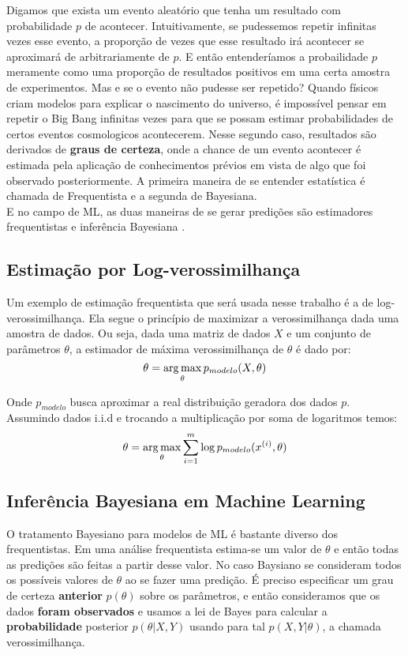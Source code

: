 Digamos que exista um evento aleatório que tenha um resultado com probabilidade $p$ de acontecer. Intuitivamente, se pudessemos repetir infinitas vezes esse evento, a proporção de vezes que esse resultado irá acontecer se aproximará de arbitrariamente de $p$. E então entenderíamos a probailidade $p$ meramente como uma proporção de resultados positivos em uma certa amostra de experimentos. Mas e se o evento não pudesse ser repetido? Quando físicos criam modelos para explicar o nascimento do universo, é impossível pensar em repetir o Big Bang infinitas vezes para que se possam estimar probabilidades de certos eventos cosmologicos acontecerem. Nesse segundo caso, resultados são derivados de \textbf{graus de certeza}, onde a chance de um evento acontecer é estimada pela aplicação de conhecimentos prévios em vista de algo que foi observado posteriormente. A primeira maneira de se entender estatística é chamada de Frequentista e a segunda de Bayesiana. \\

E no campo de ML, as duas maneiras de se gerar predições são estimadores frequentistas e inferência Bayesiana \citep{dlbook}.

\subsection{Estimação por Log-verossimilhança}

Um exemplo de estimação frequentista que será usada nesse trabalho é a de log-verossimilhança. 
Ela segue o princípio de maximizar a verossimilhança dada uma amostra de dados. Ou seja, dada uma matriz de dados $X$ e um conjunto de parâmetros $\theta$, a estimador de máxima verossimilhança de $\theta$ é dado por: \\

\[ \theta = \operatorname*{arg\,max}_{\theta} p_{modelo}(X,\theta) \] 

Onde $p_{modelo}$ busca aproximar a real distribuição geradora dos dados $p$. Assumindo dados i.i.d e trocando a multiplicação por soma de logaritmos temos: \\

\[ \theta = \operatorname*{arg\,max}_{\theta} \sum_{i=1}^{m} \log p_{modelo}(x^{(i)},\theta) \]


\subsection{Inferência Bayesiana em Machine Learning}

O tratamento Bayesiano para modelos de ML é bastante diverso dos frequentistas. Em uma análise frequentista estima-se um valor de $\theta$ e então todas as predições são feitas a partir desse valor. No caso Baysiano se consideram todos os possíveis valores de $\theta$ ao se fazer uma predição. É preciso especificar um grau de certeza \textbf{anterior} $p(\theta)$ sobre os parâmetros, e então consideramos que os dados \textbf{foram observados} e usamos a lei de Bayes para calcular a \textbf{probabilidade} posterior $p(\theta | X,Y)$ usando para tal $p(X,Y | \theta)$, a chamada verossimilhança. 

